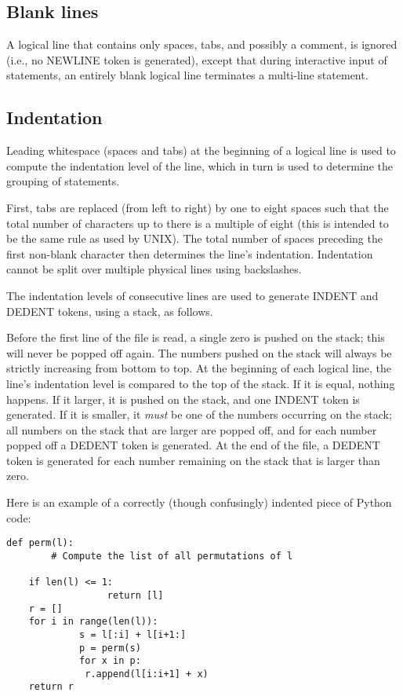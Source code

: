 \subsection{Blank lines}

A logical line that contains only spaces, tabs, and possibly a
comment, is ignored (i.e., no NEWLINE token is generated), except that
during interactive input of statements, an entirely blank logical line
terminates a multi-line statement.

\subsection{Indentation}

Leading whitespace (spaces and tabs) at the beginning of a logical
line is used to compute the indentation level of the line, which in
turn is used to determine the grouping of statements.

First, tabs are replaced (from left to right) by one to eight spaces
such that the total number of characters up to there is a multiple of
eight (this is intended to be the same rule as used by UNIX).  The
total number of spaces preceding the first non-blank character then
determines the line's indentation.  Indentation cannot be split over
multiple physical lines using backslashes.

The indentation levels of consecutive lines are used to generate
INDENT and DEDENT tokens, using a stack, as follows.

Before the first line of the file is read, a single zero is pushed on
the stack; this will never be popped off again.  The numbers pushed on
the stack will always be strictly increasing from bottom to top.  At
the beginning of each logical line, the line's indentation level is
compared to the top of the stack.  If it is equal, nothing happens.
If it larger, it is pushed on the stack, and one INDENT token is
generated.  If it is smaller, it {\em must} be one of the numbers
occurring on the stack; all numbers on the stack that are larger are
popped off, and for each number popped off a DEDENT token is
generated.  At the end of the file, a DEDENT token is generated for
each number remaining on the stack that is larger than zero.

Here is an example of a correctly (though confusingly) indented piece
of Python code:

\begin{verbatim}
def perm(l):
        # Compute the list of all permutations of l

    if len(l) <= 1:
                  return [l]
    r = []
    for i in range(len(l)):
             s = l[:i] + l[i+1:]
             p = perm(s)
             for x in p:
              r.append(l[i:i+1] + x)
    return r
\end{verbatim}

